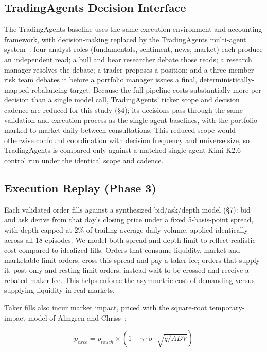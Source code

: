 \documentclass{article}
\begin{document}
\subsection{TradingAgents Decision Interface}

The TradingAgents baseline uses the same execution environment and accounting framework, with decision-making replaced by the TradingAgents multi-agent system~\cite{xiao2024ta}: four analyst roles (fundamentals, sentiment, news, market) each produce an independent read; a bull and bear researcher debate those reads; a research manager resolves the debate; a trader proposes a position; and a three-member risk team debates it before a portfolio manager issues a final, deterministically-mapped rebalancing target. Because the full pipeline costs substantially more per decision than a single model call, TradingAgents' ticker scope and decision cadence are reduced for this study (\S4); its decisions pass through the same validation and execution process as the single-agent baselines, with the portfolio marked to market daily between consultations. This reduced scope would otherwise confound coordination with decision frequency and universe size, so TradingAgents is compared only against a matched single-agent Kimi-K2.6 control run under the identical scope and cadence.

\subsection{Execution Replay (Phase 3)}

Each validated order fills against a synthesized bid/ask/depth model (\S7): bid and ask derive from that day's closing price under a fixed 5-basis-point spread, with depth capped at 2\% of trailing average daily volume, applied identically across all 18 episodes. We model both spread and depth limit to reflect realistic cost compared to idealized fills. Orders that consume liquidity, market and marketable limit orders, cross this spread and pay a taker fee; orders that supply it, post-only and resting limit orders, instead wait to be crossed and receive a rebated maker fee. This helps enforce the asymmetric cost of demanding versus supplying liquidity in real markets.

Taker fills also incur market impact, priced with the square-root temporary-impact model of Almgren and Chriss~\cite{almgren2000}:

\[
p_{exec} = p_{touch} \times \left(1 \pm \gamma \cdot \sigma \cdot \sqrt{q / ADV}\right)
\]
\end{document}
